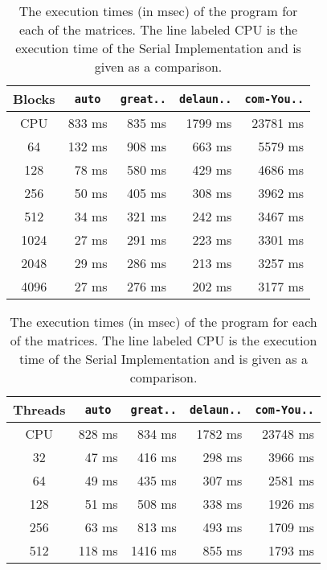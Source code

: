 \documentclass[10pt, a4paper]{article}
\begin{document}
\begin{table}[h!]
	\centering

	\caption{
		The execution times (in msec) of the program for each of the matrices. The line labeled CPU is 
		the execution time of the Serial Implementation and is given as a comparison.}

	\begin{subtable}[T]{0.45 \textwidth}
		\centering
		\begin{tabular}{|c|*{4}{r|}}
			\hline
			Blocks & \verb| auto | & \verb|great..| & \verb|delaun..| & \verb|com-You..| \\
			\hline \hline
			CPU   & 833 ms  & 835 ms  & 1799 ms  & 23781 ms \\
			\hline
			64    & 132 ms  & 908 ms  &  663 ms  & 5579 ms \\
			128   &  78 ms  & 580 ms  &  429 ms  & 4686 ms \\
			256   &  50 ms  & 405 ms  &  308 ms  & 3962 ms \\
			512   &  34 ms  & 321 ms  &  242 ms  & 3467 ms \\
			1024  &  27 ms  & 291 ms  &  223 ms  & 3301 ms \\
			2048  &  29 ms  & 286 ms  &  213 ms  & 3257 ms \\
			4096  &  27 ms  & 276 ms  &  202 ms  & 3177 ms \\
			\hline
		\end{tabular}
		\label{times:blocks}
	\end{subtable}
	\hspace{0.5cm}
	\begin{subtable}[T]{0.45 \textwidth}
		\centering
		\begin{tabular}{|c|*{4}{r|}}
			\hline
			Threads & \verb| auto | & \verb|great..| & \verb|delaun..| & \verb|com-You..| \\
			\hline \hline
			CPU     & 828 ms  &  834 ms  & 1782 ms  & 23748 ms \\
			\hline
			32      &  47 ms  &  416 ms  &  298 ms  & 3966 ms \\
			64      &  49 ms  &  435 ms  &  307 ms  & 2581 ms \\
			128     &  51 ms  &  508 ms  &  338 ms  & 1926 ms \\
			256     &  63 ms  &  813 ms  &  493 ms  & 1709 ms \\
			512     & 118 ms  & 1416 ms  &  855 ms  & 1793 ms \\
			\hline
		\end{tabular}
		\label{times:threads}
	\end{subtable}

	\label{times}
\end{table}

\printbibliography
\end{document}
